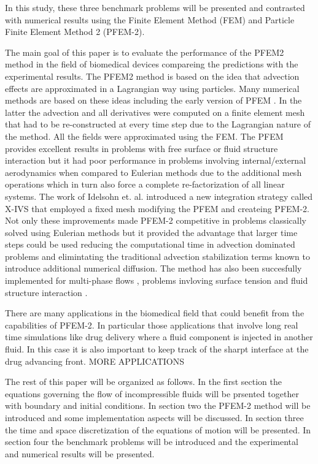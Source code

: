 In this study, these three benchmark problems will be presented and contrasted with numerical results using the Finite Element Method (FEM) and Particle Finite Element Method 2 (PFEM-2).


The main goal of this paper is to evaluate the performance of the PFEM2 method in the field of biomedical devices compareing the predictions with the experimental results. The PFEM2 method is based on the idea that advection effects are approximated in a Lagrangian way using particles. Many numerical methods are based on these ideas \cite{sph,mps,pic,mac} including the early version of PFEM \cite{sergio:PFEM}. In the latter the advection and all derivatives were computed on a finite element mesh that had to be re-constructed at every time step due to the Lagrangian nature of the method. All the fields were approximated using the FEM. The PFEM provides excellent results in problems with free surface or fluid structure interaction but it had poor performance in problems involving internal/external aerodynamics when compared to Eulerian methods due to the additional mesh operations which in turn also force a complete re-factorization of all linear systems. The work of Idelsohn et. al. \cite{sergio:xivs1,sergio:xivs2} introduced a new integration strategy called X-IVS that employed a fixed mesh modifying the PFEM and createing PFEM-2. Not only these improvements made PFEM-2 competitive in problems classically solved using Eulerian methods but it provided the advantage that larger time steps could be used \cite{gimenez:parallel} reducing the computational time in advection dominated problems and elimintating the traditional advection stabilization terms known to introduce additional numerical diffusion. The method has also been succesfully implemented for multi-phase flows \cite{sergio:pfem2_lts,gimenez:fs,gimenez:tesis}, problems invloving surface tension \cite{gimenez:st} and fluid structure interaction \cite{pablo:FSI}.

There are many applications in the biomedical field that could benefit from the capabilities of PFEM-2. In particular those applications that involve long real time simulations like drug delivery where a fluid component is injected in another fluid. In this case it is also important to keep track of the sharpt interface at the drug advancing front. {MORE APPLICATIONS}

The rest of this paper will be organized as follows. 
In the first section the equations governing the flow of incompressible fluids will be prsented together with boundary and initial conditions. 
In section two the PFEM-2 method will be introduced and some implementation aspects will be discussed.
In section three the time and space discretization of the equations of motion will be presented. 
In section four the benchmark problems will be introduced and the experimental and numerical results will be presented.
